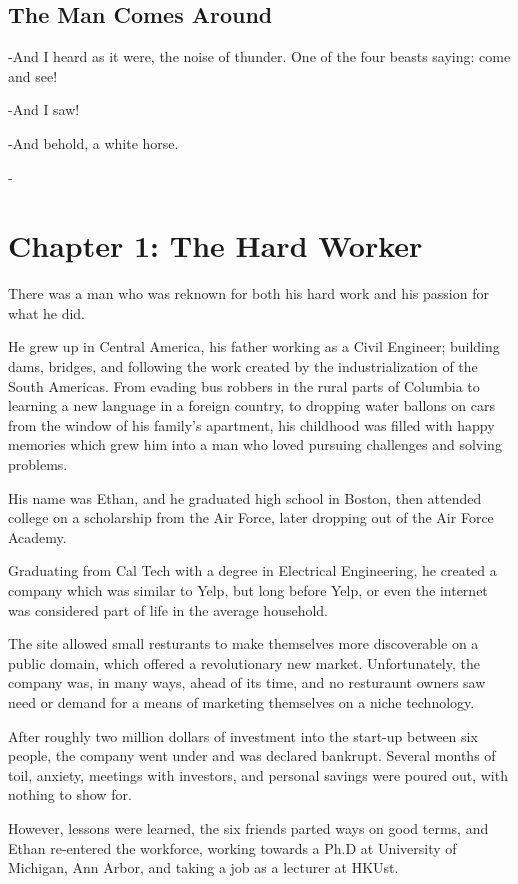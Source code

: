 \documentclass[a4paper,12pt,twoside]{book}
\begin{document}
\section{The Man Comes Around}
-And I heard as it were, the noise of thunder.  One of the four beasts saying: come and see!
 
-And I saw! 
 
-And behold, a white horse.

-\chapter{Chapter 1: The Hard Worker}
 There was a man who was reknown for both his hard work and his passion for what he did.  

He grew up in Central America, his father working as a Civil Engineer; building dams, bridges, and following the work created by the industrialization of the South Americas.  From evading bus robbers in the rural parts of Columbia to learning a new language in a foreign country, to dropping water ballons on cars from the window of his family's apartment, his childhood was filled with happy memories which grew him into a man who loved pursuing challenges and solving problems.

His name was Ethan, and he graduated high school in Boston, then attended college on a scholarship from the Air Force, later dropping out of the Air Force Academy.

Graduating from Cal Tech with a degree in Electrical Engineering, he created a company which was similar to Yelp, but long before Yelp, or even the internet was considered part of life in the average household.  

The site allowed small resturants to make themselves more discoverable on a public domain, which offered a revolutionary new market.  Unfortunately, the company was, in many ways, ahead of its time, and no resturaunt owners saw need or demand for a means of marketing themselves on a niche technology. 

After roughly two million dollars of investment into the start-up between six people, the company went under and was declared bankrupt.  Several months of toil, anxiety, meetings with investors, and personal savings were poured out, with nothing to show for.

However, lessons were learned, the six friends parted ways on good terms, and Ethan re-entered the workforce, working towards a Ph.D at University of Michigan, Ann Arbor, and taking a job as a lecturer at HKUst.
\end{document}
